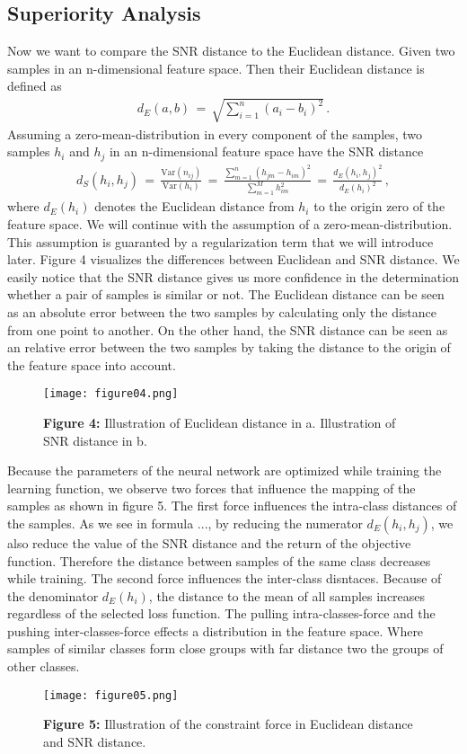 \documentclass[12pt,paper=a4]{scrartcl}
\theoremstyle{break}
\begin{document}
\subsection{Superiority Analysis}
Now we want to compare the SNR distance to the Euclidean distance. Given two samples in an n-dimensional feature space. Then their Euclidean distance is defined as
\begin{align}
d_E(a,b)\, = \, \sqrt{\sum_{i=1}^n(a_i-b_i)^2}\, .
\end{align}
Assuming a zero-mean-distribution in every component of the samples, two samples $h_i$ and $h_j$ in an n-dimensional feature space have the SNR distance
\begin{align}
d_S(h_i, h_j)\,=\,\frac{\mathrm{Var}(n_{ij})}{\mathrm{Var}(h_i)}\,=\,\frac{\sum_{m=1}^n(h_{jm}-h_{im})^2}{\sum_{m=1}^M h_{im}^2}\,=\,\frac{d_E(h_i,h_j)^2}{d_E(h_i)^2}\, ,
\end{align}
where $d_E(h_i)$ denotes the Euclidean distance from $h_i$ to the origin zero of the feature space. We will continue with the assumption of a zero-mean-distribution. This assumption is guaranted by a regularization term that we will introduce later. Figure 4 visualizes the differences between Euclidean and SNR distance. We easily notice that the SNR distance gives us more confidence in the determination whether a pair of samples is similar or not. The Euclidean distance can be seen as an absolute error between the two samples by calculating only the distance from one point to another. On the other hand, the SNR distance can be seen as an relative error between the two samples by taking the distance to the origin of the feature space into account.
\begin{figure}[h]
	\centering
  \texttt{[image: figure04.png]}
  \caption{\textbf{Figure 4:} Illustration of Euclidean distance in a. Illustration of SNR distance in b.}
\end{figure}
Because the parameters of the neural network are optimized while training the learning function, we observe two forces that influence the mapping of the samples as shown in figure 5. The first force influences the intra-class distances of the samples. As we see in formula ..., by reducing the numerator $d_E(h_i,h_j)$, we also reduce the value of the SNR distance and the return of the objective function. Therefore the distance between samples of the same class decreases while training. The second force influences the inter-class disntaces. Because of the denominator $d_E(h_i)$,  the distance to the mean of all samples increases regardless of the selected loss function. The pulling intra-classes-force and the pushing inter-classes-force effects a distribution in the feature space. Where samples of similar classes form close groups with far distance two the groups of other classes.
\begin{figure}[h]
	\centering
  \texttt{[image: figure05.png]}
  \caption{\textbf{Figure 5:} Illustration of the constraint force in Euclidean distance and SNR distance.}
\end{figure}
\end{document}

